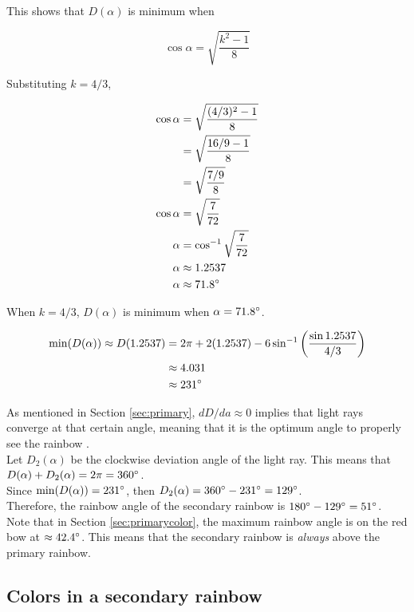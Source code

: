 \documentclass[a4paper,12pt]{article}
\begin{document}
This shows that $D(\alpha)$ is minimum when 

\begin{equation} \label{eq:cossec}
\cos \alpha = \sqrt{\frac{k^2-1}{8}}
\end{equation}

Substituting $k = 4/3$,

\begin{align*}
\cos \alpha &= \sqrt{\frac{(4/3)^2-1}{8}}\\
&= \sqrt{\frac{16/9-1}{8}}\\
&= \sqrt{\frac{7/9}{8}}\\
\cos \alpha &= \sqrt{\frac{7}{72}}\\
\alpha &= \cos^{-1} \sqrt{\frac{7}{72}}\\
\alpha &\approx 1.2537\\
\alpha &\approx 71.8 \degree\\
\end{align*}

When $k=4/3$, $D(\alpha)$ is minimum when $\alpha = 71.8 \degree$.

\begin{align*}
\min(D(\alpha)) \approx D(1.2537) &= 2\pi + 2(1.2537) - 6 \sin^{-1} \left( \frac{\sin 1.2537}{4/3} \right)\\
&\approx 4.031\\
&\approx 231 \degree\\
\end{align*}

As mentioned in Section \ref{sec:primary}, $dD/da \approx 0$ implies that light rays converge at that certain angle, meaning that it is the optimum angle to properly see the rainbow \cite[219]{stewart21}.\\

Let $D_2(\alpha)$ be the clockwise deviation angle of the light ray. This means that $D(\alpha) + D_2(\alpha) = 2\pi = 360\degree$.\\

Since $\min(D(\alpha)) = 231\degree$, then $D_2(\alpha) = 360\degree - 231\degree = 129 \degree$.\\

Therefore, the rainbow angle of the secondary rainbow is $180 \degree - 129\degree = 51\degree$. Note that in Section \ref{sec:primarycolor}, the maximum rainbow angle is on the red bow at $\approx 42.4 \degree$. This means that the secondary rainbow is {\itshape always} above the primary rainbow.

\subsection{Colors in a secondary rainbow}
\end{document}
